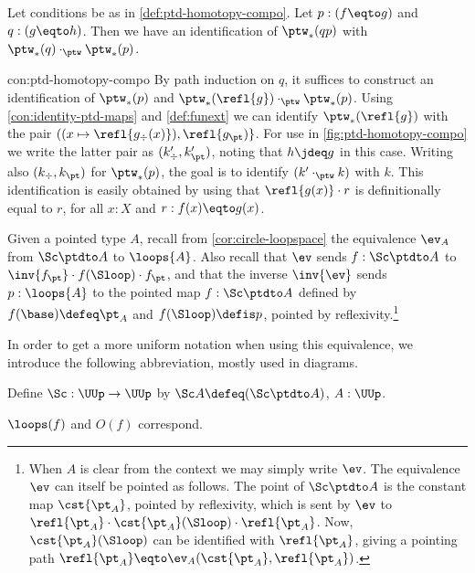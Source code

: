 \begin{construction}\label{con:ptd-homotopy-compo}
Let conditions be as in \cref{def:ptd-homotopy-compo}.
Let $p:(f\eqto g)$ and $q:(g\eqto h)$.
Then we have an identification of $\ptw_*(qp)$ with
$\ptw_*(q) \cdot_{\ptw} \ptw_*(p)$.
\end{construction}
\begin{implementation}{con:ptd-homotopy-compo}
By path induction on $q$, it suffices to construct an identification
of $\ptw_*(p)$ and $\ptw_*(\refl{g}) \cdot_{\ptw} \ptw_*(p)$.
Using \cref{con:identity-ptd-maps} and \cref{def:funext} we
can identify $\ptw_*(\refl{g})$ with the pair
$((x\mapsto\refl{g_\div(x)}),\refl{g_\pt)}$. 
For use in \cref{fig:ptd-homotopy-compo} we write the latter
pair as $(k'_\div,k'_\pt)$, noting that $h\jdeq g$ in this case.
Writing also $(k_\div,k_\pt)$ for $\ptw_*(p)$, the goal is to
identify $(k'\cdot_{\ptw} k)$ with $k$.
This identification is easily obtained by using
that $\refl{g(x)}\cdot r$ is definitionally equal to $r$,
for all $x:X$ and $r:f(x)\eqto g(x)$.
\end{implementation}

Given a pointed type $A$, recall from \cref{cor:circle-loopspace}
the equivalence $\ev_A$ from $\Sc\ptdto A$ to $\loops{A}$.
Also recall that $\ev$ sends $f:\Sc\ptdto A$ to 
$\inv{f_\pt}\cdot f(\Sloop)\cdot f_\pt$, and that the
inverse $\inv{\ev}$ sends $p:\loops{A}$ to the pointed map
$f:\Sc\ptdto A$ defined by  $f(\base)\defeq\pt_A$ and $f(\Sloop)\defis p$,
pointed by reflexivity.\footnote{When $A$ is clear from the context 
we may simply write $\ev$. The equivalence $\ev$ can itself be
pointed as follows. The point of $\Sc\ptdto A$ is the constant map 
$\cst{\pt_A}$, pointed by reflexivity, which is sent by $\ev$ 
to $\refl{\pt_A}\cdot \cst{\pt_A}(\Sloop)\cdot \refl{\pt_A}$. Now,
$\cst{\pt_A}(\Sloop)$ can be identified with $\refl{\pt_A}$, giving
a pointing path $\refl{\pt_A} \eqto \ev_A(\cst{\pt_A},\refl{\pt_A})$.}

In order to get a more uniform notation when using this equivalence,
we introduce the following abbreviation, mostly used in diagrams.
\begin{definition}\label{def:prefix-Sc}
Define $\Sc:\UUp\to\UUp$ by $\Sc A\defeq (\Sc\ptdto A)$, $A:\UUp$.\qedhere 
\end{definition}

\begin{marginfigure}
  \caption{\label{fig:Omega-O} $\loops(f)$ and $O(f)$ correspond.} 
\end{marginfigure}

